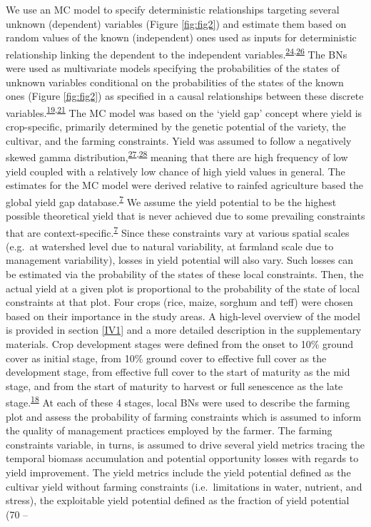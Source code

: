 \documentclass[12pt,oneside]{article}
\begin{document}
We use an MC model to specify deterministic relationships targeting several unknown (dependent) variables (Figure \ref{fig:fig2}) and estimate them based on random values of the known (independent) ones used as inputs for deterministic relationship linking the dependent to the independent variables.\textsuperscript{\protect\hyperlink{ref-Rosenstock_et_al_2014}{24},\protect\hyperlink{ref-Luedeling_et_al_2015}{26}} The BNs were used as multivariate models specifying the probabilities of the states of unknown variables conditional on the probabilities of the states of the known ones (Figure \ref{fig:fig2}) as specified in a causal relationships between these discrete variables.\textsuperscript{\protect\hyperlink{ref-Pearl_1988}{19},\protect\hyperlink{ref-Jensen_1996}{21}} The MC model was based on the `yield gap' concept where yield is crop-specific, primarily determined by the genetic potential of the variety, the cultivar, and the farming constraints. Yield was assumed to follow a negatively skewed gamma distribution,\textsuperscript{\protect\hyperlink{ref-Gallagher_1987}{27},\protect\hyperlink{ref-Ramirez_et_al_2003}{28}} meaning that there are high frequency of low yield coupled with a relatively low chance of high yield values in general. The estimates for the MC model were derived relative to rainfed agriculture based the global yield gap database.\textsuperscript{\protect\hyperlink{ref-VanIttersum_et_al_2013}{7}} We assume the yield potential to be the highest possible theoretical yield that is never achieved due to some prevailing constraints that are context-specific.\textsuperscript{\protect\hyperlink{ref-VanIttersum_et_al_2013}{7}} Since these constraints vary at various spatial scales (e.g.~at watershed level due to natural variability, at farmland scale due to management variability), losses in yield potential will also vary. Such losses can be estimated via the probability of the states of these local constraints. Then, the actual yield at a given plot is proportional to the probability of the state of local constraints at that plot. Four crops (rice, maize, sorghum and teff) were chosen based on their importance in the study areas. A high-level overview of the model is provided in section \ref{IV1} and a more detailed description in the supplementary materials. Crop development stages were defined from the onset to 10\% ground cover as initial stage, from 10\% ground cover to effective full cover as the development stage, from effective full cover to the start of maturity as the mid stage, and from the start of maturity to harvest or full senescence as the late stage.\textsuperscript{\protect\hyperlink{ref-Allen_et_al_1998}{18}} At each of these 4 stages, local BNs were used to describe the farming plot and assess the probability of farming constraints which is assumed to inform the quality of management practices employed by the farmer. The farming constraints variable, in turns, is assumed to drive several yield metrics tracing the temporal biomass accumulation and potential opportunity losses with regards to yield improvement. The yield metrics include the yield potential defined as the cultivar yield without farming constraints (i.e.~limitations in water, nutrient, and stress), the exploitable yield potential defined as the fraction of yield potential (70 -- 
\end{document}
